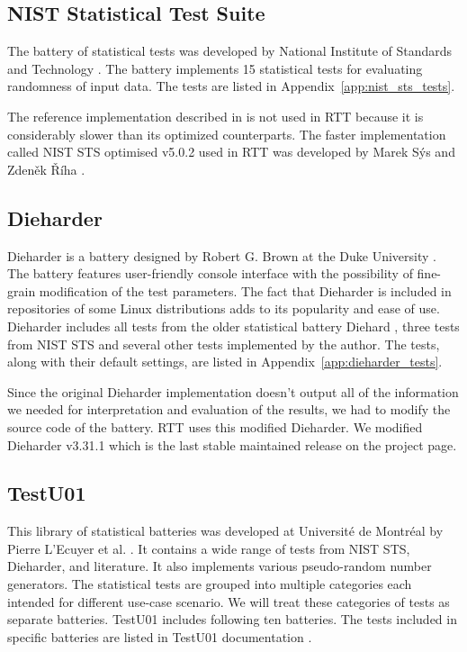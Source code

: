 \documentclass[
  digital,  	%
  color,		%
  oneside,   	%
  12pt,
  nocover,
  notable,
  nolof,
  nolot,
]{fithesis3}
\theoremstyle{definition}
\theoremstyle{remark}
\begin{document}
\subsection{NIST Statistical Test Suite}
The battery of statistical tests was developed by National Institute of Standards and Technology \cite{nist-sts}. The battery implements 15 statistical tests for evaluating randomness of input data. The tests are listed in Appendix~\ref{app:nist_sts_tests}.

The reference implementation described in \cite{nist-sts-documentation} is not used in RTT because it is considerably slower than its optimized counterparts. The faster implementation called NIST STS optimised v5.0.2 used in RTT was developed by Marek Sýs and Zdeněk Říha \cite{nist-sts-syso-optimization}.

\subsection{Dieharder}
Dieharder is a battery designed by Robert G. Brown at the Duke University \cite{dieharder}. The battery features user-friendly console interface with the possibility of fine-grain modification of the test parameters. The fact that Dieharder is included in repositories of some Linux distributions \cite{dieharder-manpage} adds to its popularity and ease of use. Dieharder includes all tests from the older statistical battery Diehard \cite{diehard}, three tests from NIST STS and several other tests implemented by the author. The tests, along with their default settings, are listed in Appendix~\ref{app:dieharder_tests}.

Since the original Dieharder implementation doesn't output all of the information we needed for interpretation and evaluation of the results, we had to modify the source code of the battery. RTT uses this modified Dieharder. We modified Dieharder v3.31.1 which is the last stable maintained release on the project page.

\subsection{TestU01}
This library of statistical batteries was developed at Université de Montréal by Pierre L’Ecuyer et al. \cite{testu01-paper}. It contains a wide range of tests from NIST STS, Dieharder, and literature. It also implements various pseudo-random number generators. The statistical tests are grouped into multiple categories each intended for different use-case scenario. We will treat these categories of tests as separate batteries. TestU01 includes following ten batteries. The tests included in specific batteries are listed in TestU01 documentation \cite{testu01-documentation}.
\end{document}
